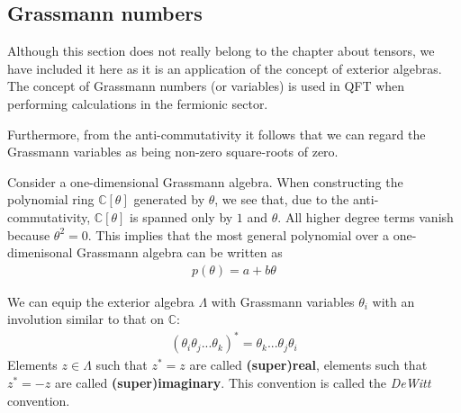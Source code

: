 	
\subsection{Grassmann numbers}

	Although this section does not really belong to the chapter about tensors, we have included it here as it is an application of the concept of exterior algebras. The concept of Grassmann numbers (or variables) is used in QFT when performing calculations in the fermionic sector.
	
	\begin{remark}
		Furthermore, from the anti-commutativity it follows that we can regard the Grassmann variables as being non-zero square-roots of zero.
	\end{remark}
	
	\begin{property}
		Consider a one-dimensional Grassmann algebra. When constructing the polynomial ring $\mathbb{C}[\theta]$ generated by $\theta$, we see that, due to the anti-commutativity, $\mathbb{C}[\theta]$ is spanned only by $1$ and $\theta$. All higher degree terms vanish because $\theta^2 = 0$. This implies that the most general polynomial over a one-dimenisonal Grassmann algebra can be written as
		\begin{gather}
			p(\theta) = a + b\theta
		\end{gather}
	\end{property}
	
	\begin{definition}
		We can equip the exterior algebra $\Lambda$ with Grassmann variables $\theta_i$ with an involution similar to that on $\mathbb{C}$:
		\begin{gather}
			(\theta_i\theta_j...\theta_k)^* = \theta_k...\theta_j\theta_i
		\end{gather}
		Elements $z\in\Lambda$ such that $z^* = z$ are called \textbf{(super)real}, elements such that $z^* = -z$ are called \textbf{(super)imaginary}. This convention is called the \textit{DeWitt} convention.
	\end{definition}
